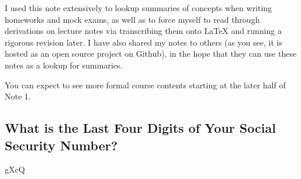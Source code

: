 I used this note extensively to lookup summaries of concepts when writing homeworks and mock exams, as well as to force myself to read through derivations on lecture notes via transcribing them onto LaTeX and running a rigorous revision later.
I have also shared my notes to others (as you see, it is hosted as an open source project on Github), in the hope that they can use these notes as a lookup for summaries.

You can expect to see more formal course contents starting at the later half of Note 1.

\subsection{What is the Last Four Digits of Your Social Security Number?}
gXcQ
